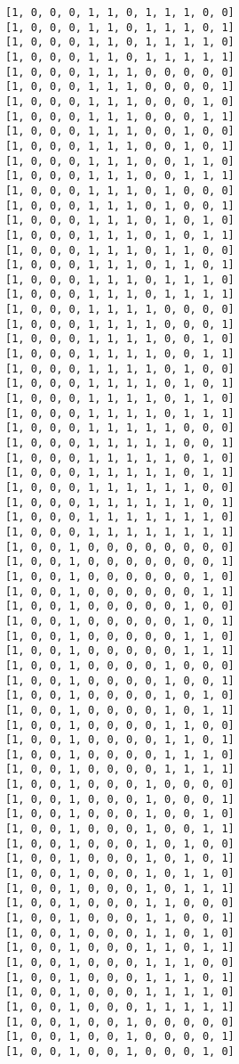 \documentclass[11pt]{article}
\begin{document}
\begin{Verbatim}[commandchars=\\\{\}]
[1, 0, 0, 0, 1, 1, 0, 1, 1, 1, 0, 0]
[1, 0, 0, 0, 1, 1, 0, 1, 1, 1, 0, 1]
[1, 0, 0, 0, 1, 1, 0, 1, 1, 1, 1, 0]
[1, 0, 0, 0, 1, 1, 0, 1, 1, 1, 1, 1]
[1, 0, 0, 0, 1, 1, 1, 0, 0, 0, 0, 0]
[1, 0, 0, 0, 1, 1, 1, 0, 0, 0, 0, 1]
[1, 0, 0, 0, 1, 1, 1, 0, 0, 0, 1, 0]
[1, 0, 0, 0, 1, 1, 1, 0, 0, 0, 1, 1]
[1, 0, 0, 0, 1, 1, 1, 0, 0, 1, 0, 0]
[1, 0, 0, 0, 1, 1, 1, 0, 0, 1, 0, 1]
[1, 0, 0, 0, 1, 1, 1, 0, 0, 1, 1, 0]
[1, 0, 0, 0, 1, 1, 1, 0, 0, 1, 1, 1]
[1, 0, 0, 0, 1, 1, 1, 0, 1, 0, 0, 0]
[1, 0, 0, 0, 1, 1, 1, 0, 1, 0, 0, 1]
[1, 0, 0, 0, 1, 1, 1, 0, 1, 0, 1, 0]
[1, 0, 0, 0, 1, 1, 1, 0, 1, 0, 1, 1]
[1, 0, 0, 0, 1, 1, 1, 0, 1, 1, 0, 0]
[1, 0, 0, 0, 1, 1, 1, 0, 1, 1, 0, 1]
[1, 0, 0, 0, 1, 1, 1, 0, 1, 1, 1, 0]
[1, 0, 0, 0, 1, 1, 1, 0, 1, 1, 1, 1]
[1, 0, 0, 0, 1, 1, 1, 1, 0, 0, 0, 0]
[1, 0, 0, 0, 1, 1, 1, 1, 0, 0, 0, 1]
[1, 0, 0, 0, 1, 1, 1, 1, 0, 0, 1, 0]
[1, 0, 0, 0, 1, 1, 1, 1, 0, 0, 1, 1]
[1, 0, 0, 0, 1, 1, 1, 1, 0, 1, 0, 0]
[1, 0, 0, 0, 1, 1, 1, 1, 0, 1, 0, 1]
[1, 0, 0, 0, 1, 1, 1, 1, 0, 1, 1, 0]
[1, 0, 0, 0, 1, 1, 1, 1, 0, 1, 1, 1]
[1, 0, 0, 0, 1, 1, 1, 1, 1, 0, 0, 0]
[1, 0, 0, 0, 1, 1, 1, 1, 1, 0, 0, 1]
[1, 0, 0, 0, 1, 1, 1, 1, 1, 0, 1, 0]
[1, 0, 0, 0, 1, 1, 1, 1, 1, 0, 1, 1]
[1, 0, 0, 0, 1, 1, 1, 1, 1, 1, 0, 0]
[1, 0, 0, 0, 1, 1, 1, 1, 1, 1, 0, 1]
[1, 0, 0, 0, 1, 1, 1, 1, 1, 1, 1, 0]
[1, 0, 0, 0, 1, 1, 1, 1, 1, 1, 1, 1]
[1, 0, 0, 1, 0, 0, 0, 0, 0, 0, 0, 0]
[1, 0, 0, 1, 0, 0, 0, 0, 0, 0, 0, 1]
[1, 0, 0, 1, 0, 0, 0, 0, 0, 0, 1, 0]
[1, 0, 0, 1, 0, 0, 0, 0, 0, 0, 1, 1]
[1, 0, 0, 1, 0, 0, 0, 0, 0, 1, 0, 0]
[1, 0, 0, 1, 0, 0, 0, 0, 0, 1, 0, 1]
[1, 0, 0, 1, 0, 0, 0, 0, 0, 1, 1, 0]
[1, 0, 0, 1, 0, 0, 0, 0, 0, 1, 1, 1]
[1, 0, 0, 1, 0, 0, 0, 0, 1, 0, 0, 0]
[1, 0, 0, 1, 0, 0, 0, 0, 1, 0, 0, 1]
[1, 0, 0, 1, 0, 0, 0, 0, 1, 0, 1, 0]
[1, 0, 0, 1, 0, 0, 0, 0, 1, 0, 1, 1]
[1, 0, 0, 1, 0, 0, 0, 0, 1, 1, 0, 0]
[1, 0, 0, 1, 0, 0, 0, 0, 1, 1, 0, 1]
[1, 0, 0, 1, 0, 0, 0, 0, 1, 1, 1, 0]
[1, 0, 0, 1, 0, 0, 0, 0, 1, 1, 1, 1]
[1, 0, 0, 1, 0, 0, 0, 1, 0, 0, 0, 0]
[1, 0, 0, 1, 0, 0, 0, 1, 0, 0, 0, 1]
[1, 0, 0, 1, 0, 0, 0, 1, 0, 0, 1, 0]
[1, 0, 0, 1, 0, 0, 0, 1, 0, 0, 1, 1]
[1, 0, 0, 1, 0, 0, 0, 1, 0, 1, 0, 0]
[1, 0, 0, 1, 0, 0, 0, 1, 0, 1, 0, 1]
[1, 0, 0, 1, 0, 0, 0, 1, 0, 1, 1, 0]
[1, 0, 0, 1, 0, 0, 0, 1, 0, 1, 1, 1]
[1, 0, 0, 1, 0, 0, 0, 1, 1, 0, 0, 0]
[1, 0, 0, 1, 0, 0, 0, 1, 1, 0, 0, 1]
[1, 0, 0, 1, 0, 0, 0, 1, 1, 0, 1, 0]
[1, 0, 0, 1, 0, 0, 0, 1, 1, 0, 1, 1]
[1, 0, 0, 1, 0, 0, 0, 1, 1, 1, 0, 0]
[1, 0, 0, 1, 0, 0, 0, 1, 1, 1, 0, 1]
[1, 0, 0, 1, 0, 0, 0, 1, 1, 1, 1, 0]
[1, 0, 0, 1, 0, 0, 0, 1, 1, 1, 1, 1]
[1, 0, 0, 1, 0, 0, 1, 0, 0, 0, 0, 0]
[1, 0, 0, 1, 0, 0, 1, 0, 0, 0, 0, 1]
[1, 0, 0, 1, 0, 0, 1, 0, 0, 0, 1, 0]

\end{Verbatim}
\end{document}
